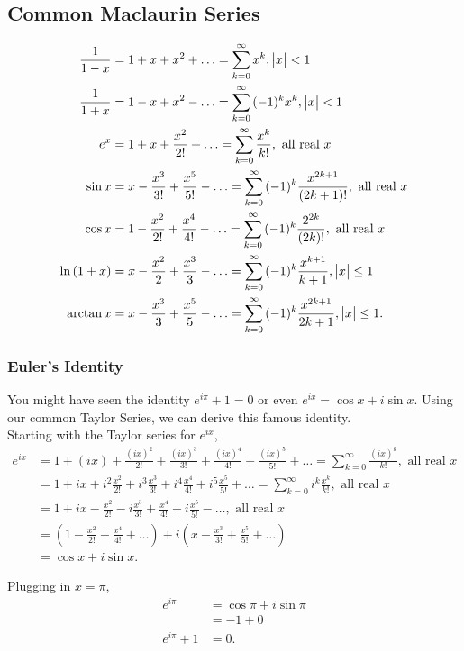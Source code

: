 \subsection{Common Maclaurin Series}
\begin{align*}
	\frac{1}{1-x} &= 1 + x + x^2 + \ldots = \sum_{k=0}^{\infty}{x^k}, \big\lvert x \big\rvert < 1 \\
	\frac{1}{1+x} &= 1 - x + x^2 - \ldots = \sum_{k=0}^{\infty}{(-1)^kx^k}, \big\lvert x \big\rvert < 1 \\
	e^x &= 1 + x + \frac{x^2}{2!} + \ldots = \sum_{k=0}^{\infty}{\frac{x^k}{k!}}, \text{ all real $x$} \\
	\sin{x} &= x - \frac{x^3}{3!} + \frac{x^5}{5!} - \ldots = \sum_{k=0}^{\infty}{(-1)^k\frac{x^{2k+1}}{(2k+1)!}}, \text{ all real $x$} \\
	\cos{x} &= 1 - \frac{x^2}{2!} + \frac{x^4}{4!} - \ldots = \sum_{k=0}^{\infty}{(-1)^k\frac{2^{2k}}{(2k)!}}, \text{ all real $x$} \\
	\ln{(1+x)} &= x - \frac{x^2}{2} + \frac{x^3}{3} - \ldots = \sum_{k=0}^{\infty}{(-1)^k\frac{x^{k+1}}{k+1}}, \big\lvert x \big\rvert \leq 1 \\
	\arctan{x} &= x - \frac{x^3}{3} + \frac{x^5}{5} - \ldots = \sum_{k=0}^{\infty}{(-1)^k\frac{x^{2k+1}}{2k+1}}, \big\lvert x \big\rvert \leq 1.
\end{align*}

\subsubsection{Euler's Identity}
You might have seen the identity $e^{i\pi} + 1 = 0$ or even $e^{ix} = \cos{x} + i\sin{x}$.
Using our common Taylor Series, we can derive this famous identity. \\


Starting with the Taylor series for $e^{ix}$,
\begin{align*}
	e^{ix} &= 1 + (ix) + \frac{(ix)^2}{2!} + \frac{(ix)^3}{3!} + \frac{(ix)^4}{4!} + \frac{(ix)^5}{5!} + \ldots = \sum_{k=0}^{\infty}{\frac{(ix)^k}{k!}}, \text{ all real $x$} \\
	&= 1 + ix + i^2\frac{x^2}{2!} + i^3\frac{x^3}{3!} + i^4\frac{x^4}{4!} + i^5\frac{x^5}{5!} + \ldots = \sum_{k=0}^{\infty}{i^k\frac{x^k}{k!}}, \text{ all real $x$} \\
	&= 1 + ix - \frac{x^2}{2!} - i\frac{x^3}{3!} + \frac{x^4}{4!} + i\frac{x^5}{5!} - \ldots, \text{ all real $x$} \\
	&= \left(1 - \frac{x^2}{2!} + \frac{x^4}{4!} + \ldots \right) + i\left(x - \frac{x^3}{3!} + \frac{x^5}{5!} + \ldots \right) \\
	&= \cos{x} + i\sin{x}.
\end{align*}

Plugging in $x=\pi$,
\begin{align*}
	e^{i\pi} &= \cos{\pi} + i\sin{\pi} \\
	&= -1 + 0 \\
	e^{i\pi} + 1 &= 0.
\end{align*}